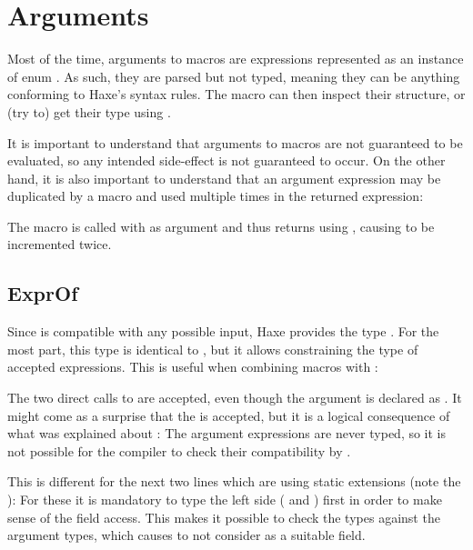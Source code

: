 \section{Arguments}
\label{macro-arguments}

Most of the time, arguments to macros are expressions represented as an instance of enum . As such, they are parsed but not typed, meaning they can be anything conforming to Haxe's syntax rules. The macro can then inspect their structure, or (try to) get their type using .

It is important to understand that arguments to macros are not guaranteed to be evaluated, so any intended side-effect is not guaranteed to occur. On the other hand, it is also important to understand that an argument expression may be duplicated by a macro and used multiple times in the returned expression:


The macro  is called with  as argument and thus returns  using , causing  to be incremented twice.

\subsection{ExprOf}
\label{macro-ExprOf}

Since  is compatible with any possible input, Haxe provides the type . For the most part, this type is identical to , but it allows constraining the type of accepted expressions. This is useful when combining macros with :


The two direct calls to  are accepted, even though the argument is declared as . It might come as a surprise that the   is accepted, but it is a logical consequence of what was explained about : The argument expressions are never typed, so it is not possible for the compiler to check their compatibility by .

This is different for the next two lines which are using static extensions (note the ): For these it is mandatory to type the left side ( and ) first in order to make sense of the  field access. This makes it possible to check the types against the argument types, which causes  to not consider  as a suitable field.

